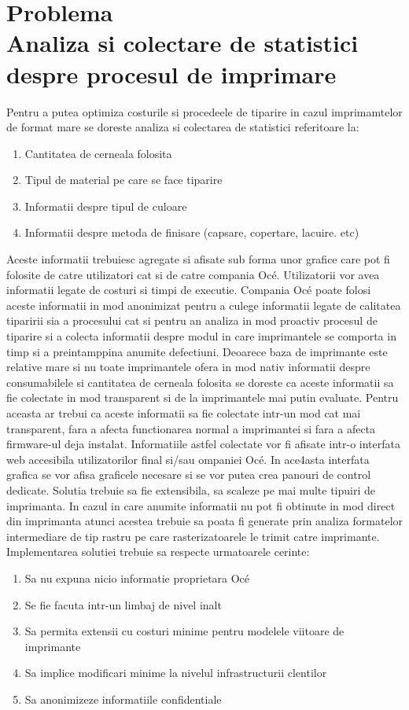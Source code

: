 \documentclass[12pt]{report}
\begin{document}
	\section[Problema.Analiza si colectare de statistici despre procesul de imprimare]{Problema \\ {\large Analiza si colectare de statistici despre procesul de imprimare}}

Pentru a putea optimiza costurile si procedeele de tiparire in cazul imprimamtelor de format mare se doreste analiza si colectarea de statistici referitoare la: 
\begin{enumerate}
\item Cantitatea de cerneala folosita
\item Tipul de material pe care se face tiparire
\item Informatii despre tipul de culoare 
\item Informatii despre metoda de finisare (capsare, copertare, lacuire. etc)
\end{enumerate}
Aceste informatii trebuiesc agregate si afisate sub forma unor grafice care pot fi folosite de catre utilizatori cat si de catre compania Océ. Utilizatorii vor avea informatii legate de costuri si timpi de executie. Compania Océ poate folosi aceste informatii in mod anonimizat pentru a culege informatii legate de calitatea tiparirii sia a procesului cat si pentru an analiza in mod proactiv procesul de tiparire si a colecta informatii despre modul in care imprimantele se comporta in timp si a preintamppina anumite defectiuni. 
Deoarece baza de imprimante este relative mare si nu toate imprimantele ofera in mod nativ informatii despre consumabilele si cantitatea de cerneala folosita se doreste ca aceste informatii sa fie colectate in mod transparent si de la imprimantele mai putin evaluate. Pentru aceasta ar trebui ca aceste informatii sa fie colectate intr-un mod cat mai transparent, fara a afecta functionarea normal a imprimantei si fara a afecta firmware-ul deja instalat. 
Informatiile astfel colectate  vor fi afisate intr-o interfata web accesibila utilizatorilor final si/sau ompaniei Océ. In ace4asta interfata grafica se vor afisa graficele necesare si se vor putea crea panouri de control dedicate.
Solutia trebuie sa fie extensibila, sa scaleze pe mai multe tipuiri de imprimanta. 
In cazul in care anumite informatii nu pot fi obtinute in mod direct din imprimanta atunci acestea trebuie sa poata fi generate prin analiza formatelor intermediare de tip rastru pe care rasterizatoarele le trimit catre imprimante. 
Implementarea solutiei trebuie sa respecte urmatoarele cerinte:
\begin{enumerate}
\item Sa nu expuna nicio informatie proprietara Océ
\item Se fie facuta intr-un limbaj de nivel inalt
\item Sa permita extensii cu costuri minime pentru modelele viitoare de imprimante
\item Sa implice  modificari minime la nivelul infrastructurii clentilor
\item Sa anonimizeze informatiile confidentiale 
\end{enumerate}
\end{document}
